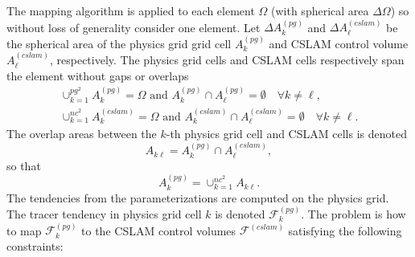 The mapping algorithm is applied to each element $\Omega$ (with spherical area $\Delta \Omega$) so without loss of generality consider one element. Let $\Delta A^{(pg)}_k$ and $\Delta A^{(cslam)}_\ell$ be the spherical area of the physics grid grid cell $A^{(pg)}_k$ and CSLAM control volume $A^{(cslam)}_\ell$, respectively. The physics grid cells and CSLAM cells respectively span the element without gaps or overlaps
\begin{eqnarray}
\cup_{k=1}^{pg^2}A^{(pg)}_k=\Omega \text{ and } A^{(pg)}_k \cap A^{(pg)}_\ell = \emptyset \quad \forall k\ne \ell,\\
\cup_{k=1}^{nc^2}A^{(cslam)}_k=\Omega \text{ and } A^{(cslam)}_k \cap A^{(cslam)}_\ell = \emptyset \quad \forall k\ne \ell.
\end{eqnarray}
The overlap areas between the $k$-th physics grid cell and CSLAM cells is denoted
\begin{equation}
A_{k\ell}=A^{(pg)}_k \cap A^{(cslam)}_\ell,
\end{equation}
so that
\begin{equation}
A^{(pg)}_k=\cup_{k=1}^{nc^2}A_{k\ell}.
\end{equation}
The tendencies from the parameterizations are computed on the physics grid. The tracer tendency in physics grid cell $k$ is denoted $\mathcal F_k^{(pg)}$. The problem is how to map $\mathcal F_k^{(pg)}$ to the CSLAM control volumes $\mathcal F^{(cslam)}$ satisfying the following constraints:
